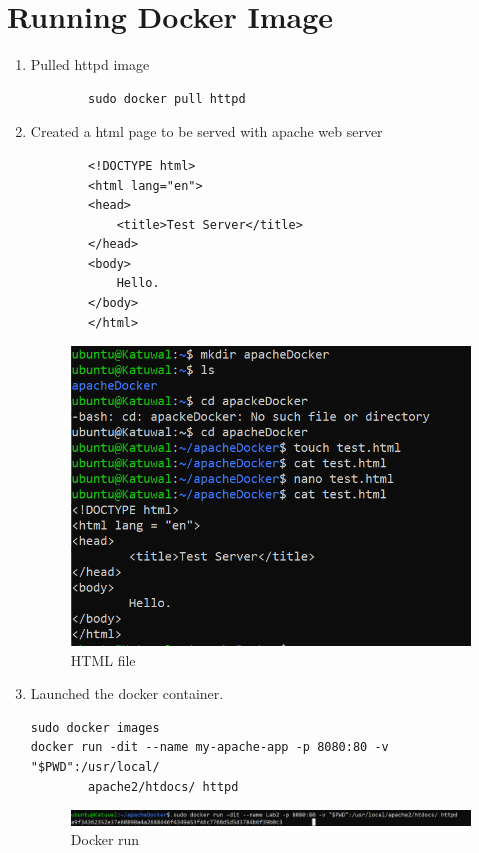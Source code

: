\documentclass[12pt]{article}
\begin{document}
\section{Running Docker Image}
\begin{enumerate}
    \item Pulled httpd image
    \begin{verbatim}
        sudo docker pull httpd
    \end{verbatim}
    \item Created a html page to be served with apache web server
    \begin{verbatim}
        <!DOCTYPE html>
        <html lang="en">
        <head>
            <title>Test Server</title>
        </head>
        <body>
            Hello.
        </body>
        </html>
    \end{verbatim}
    \begin{figure}[h!]
        \centering
        \includegraphics{Images/apacheHTML.PNG}
        \caption{HTML file}
    \end{figure}

    \item Launched the docker container.
    \begin{verbatim}
sudo docker images
docker run -dit --name my-apache-app -p 8080:80 -v "$PWD":/usr/local/
        apache2/htdocs/ httpd
    \end{verbatim}
    \begin{figure}[h!]
        \centering
        \includegraphics[scale = 0.50]{Images/docker_run.PNG}
        \caption{Docker run}
    \end{figure}
\end{enumerate}
\end{document}
